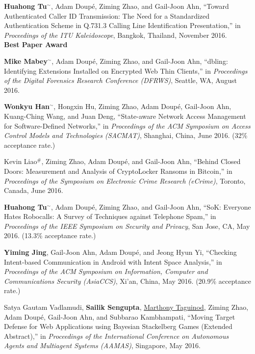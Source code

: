\documentclass[11pt,letterpaper,sans]{moderncv}
\begin{document}
\begin{etaremune}
\item \textbf{Huahong Tu}$^{\sim}$, Adam Doup\'e, Ziming Zhao, and
  Gail-Joon Ahn, ``Toward Authenticated Caller ID Transmission: The
  Need for a Standardized Authentication Scheme in Q.731.3 Calling
  Line Identification Presentation,'' in \emph{Proceedings of the ITU
    Kaleidoscope}, Bangkok, Thailand, November 2016. \\
  \textbf{Best Paper Award}

\item \textbf{Mike Mabey}$^{\sim}$, Adam Doup\'e, Ziming Zhao, and
  Gail-Joon Ahn, ``dbling: Identifying Extensions Installed on
  Encrypted Web Thin Clients,'' in \emph{Proceedings of the Digital
    Forensics Research Conference (DFRWS)}, Seattle, WA, August 2016.

\item \textbf{Wonkyu Han}$^{\sim}$, Hongxin Hu, Ziming Zhao, Adam
  Doup\'e, Gail-Joon Ahn, Kuang-Ching Wang, and Juan Deng,
  ``State-aware Network Access Management for Software-Defined
  Networks,'' in \emph{Proceedings of the ACM Symposium on Access
    Control Models and Technologies (SACMAT)}, Shanghai, China, June
  2016. (32\% acceptance rate.)

\item Kevin Liao$^{\#}$, Ziming Zhao, Adam Doup\'e,
  and Gail-Joon Ahn, ``Behind Closed Doors: Measurement and Analysis
  of CryptoLocker Ransoms in Bitcoin,'' in \emph{Proceedings of the
    Symposium on Electronic Crime Research (eCrime)}, Toronto, Canada,
  June 2016.

\item \textbf{Huahong Tu}$^{\sim}$, Adam Doup\'e, Ziming Zhao, and
  Gail-Joon Ahn, ``SoK: Everyone Hates Robocalls: A Survey of
  Techniques against Telephone Spam,'' in \emph{Proceedings of the
    IEEE Symposium on Security and Privacy}, San Jose, CA, May 2016.
  (13.3\% acceptance rate.)

\item \textbf{Yiming Jing}, Gail-Joon Ahn, Adam Doup\'e,
  and Jeong Hyun Yi, ``Checking Intent-based Communication in Android
  with Intent Space Analysis,'' in \emph{Proceedings of the ACM
    Symposium on Information, Computer and Communications Security
  (AsiaCCS)}, Xi’an, China, May 2016. (20.9\% acceptance
  rate.)

\item Satya Gautam Vadlamudi, \textbf{Sailik Sengupta}, \underline{Marthony
  Taguinod}, Ziming Zhao, Adam Doup\'e, Gail-Joon Ahn, and
  Subbarao Kambhampati, ``Moving Target Defense for Web Applications
  using Bayesian Stackelberg Games (Extended Abstract),'' in
  \emph{Proceedings of the International Conference on Autonomous
    Agents and Multiagent Systems (AAMAS)}, Singapore, May 2016.


\end{etaremune}
\end{document}
